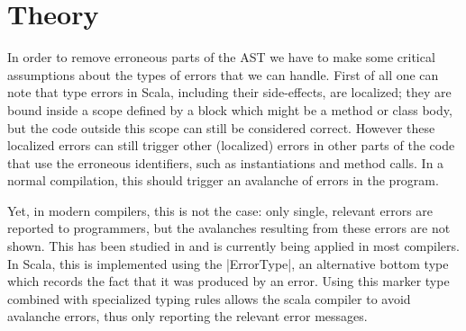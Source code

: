 \section{Theory}


In order to remove erroneous parts of the AST we have to make some critical assumptions about the types of errors that we can handle. First of all one can note that type errors in Scala, including their side-effects, are localized; they are bound inside a scope defined by a block which might be a method or class body, but the code outside this scope can still be considered correct. However these localized errors can still trigger other (localized) errors in other parts of the code that use the erroneous identifiers, such as instantiations and method calls. In a normal compilation, this should trigger an avalanche of errors in the program.

Yet, in modern compilers, this is not the case: only single, relevant errors are reported to programmers, but the avalanches resulting from these errors are not shown. This has been studied in \cite{spurious} and is currently being applied in most compilers. In Scala, this is implemented using the |ErrorType|, an alternative bottom type which records the fact that it was produced by an error. Using this marker type combined with specialized typing rules allows the scala compiler to avoid avalanche errors, thus only reporting the relevant error messages.

